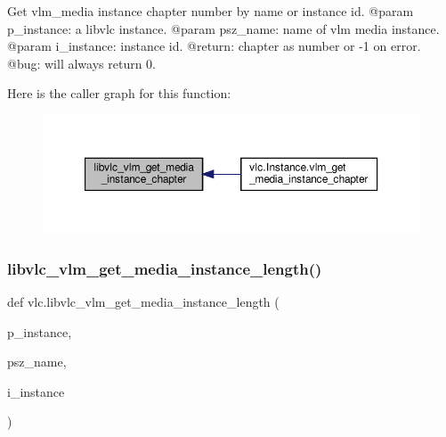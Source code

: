 \begin{DoxyVerb}Get vlm_media instance chapter number by name or instance id.
@param p_instance: a libvlc instance.
@param psz_name: name of vlm media instance.
@param i_instance: instance id.
@return: chapter as number or -1 on error.
@bug: will always return 0.
\end{DoxyVerb}
 Here is the caller graph for this function\+:
\nopagebreak
\begin{figure}[H]
\begin{center}
\leavevmode
\includegraphics[width=350pt]{namespacevlc_a6f3929a65f89f072354d79c5000a8651_icgraph}
\end{center}
\end{figure}
\mbox{\label{namespacevlc_ae253451e4dd490269fe9131dbf1abebd}} 
\subsubsection{\texorpdfstring{libvlc\+\_\+vlm\+\_\+get\+\_\+media\+\_\+instance\+\_\+length()}{libvlc\_vlm\_get\_media\_instance\_length()}}
{\footnotesize\ttfamily def vlc.\+libvlc\+\_\+vlm\+\_\+get\+\_\+media\+\_\+instance\+\_\+length (\begin{DoxyParamCaption}\item[{}]{p\+\_\+instance,  }\item[{}]{psz\+\_\+name,  }\item[{}]{i\+\_\+instance }\end{DoxyParamCaption})}

